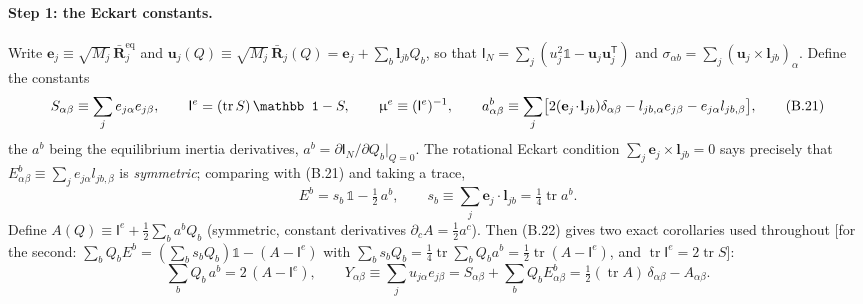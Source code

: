 \paragraph{Step 1: the Eckart constants.}
Write $\mathbf e_j\equiv\sqrt{M_j}\,\bar{\mathbf R}^{\mathrm{eq}}_j$ and $\mathbf u_j(Q)\equiv\sqrt{M_j}\,\bar{\mathbf R}_j(Q)=\mathbf e_j+\sum_b\mathbf l_{jb}Q_b$, so that $\mathsf I_N=\sum_j(u_j^2\mathbb 1-\mathbf u_j\mathbf u_j^{\mathsf T})$ and $\sigma_{\alpha b}=\sum_j(\mathbf u_j\times\mathbf l_{jb})_\alpha$. Define the constants
\begin{equation}
S_{\alpha\beta}\equiv\sum_j e_{j\alpha}e_{j\beta},\qquad
\mathsf I^{e}=(\operatorname{tr}S)\,\mathbb 1-S,\qquad
\Mmu^{e}\equiv(\mathsf I^{e})^{-1},\qquad
a^{b}_{\alpha\beta}\equiv\sum_j\bigl[2(\mathbf e_j\!\cdot\!\mathbf l_{jb})\delta_{\alpha\beta}-l_{jb,\alpha}e_{j\beta}-e_{j\alpha}l_{jb,\beta}\bigr], \tag{B.21}
\end{equation}
the $a^{b}$ being the equilibrium inertia derivatives, $a^b=\partial\mathsf I_N/\partial Q_b|_{Q=0}$. The rotational Eckart condition $\sum_j\mathbf e_j\times\mathbf l_{jb}=0$ says precisely that $E^{b}_{\alpha\beta}\equiv\sum_je_{j\alpha}l_{jb,\beta}$ is \emph{symmetric}; comparing with (B.21) and taking a trace,
\begin{equation}
E^{b}=s_b\,\mathbb 1-\tfrac12\,a^{b},\qquad
s_b\equiv\sum_j\mathbf e_j\!\cdot\!\mathbf l_{jb}=\tfrac14\operatorname{tr}a^{b}. \tag{B.22}
\end{equation}
Define $A(Q)\equiv\mathsf I^{e}+\tfrac12\sum_b a^{b}Q_b$ (symmetric, constant derivatives $\partial_cA=\tfrac12a^c$). Then (B.22) gives two exact corollaries used throughout [for the second: $\sum_bQ_bE^b=(\sum_bs_bQ_b)\mathbb 1-(A-\mathsf I^e)$ with $\sum_bs_bQ_b=\tfrac14\operatorname{tr}\!\sum_bQ_ba^b=\tfrac12\operatorname{tr}(A-\mathsf I^e)$, and $\operatorname{tr}\mathsf I^e=2\operatorname{tr}S$]:
\begin{equation}
\sum_bQ_b\,a^{b}=2\,(A-\mathsf I^{e}),
\qquad
Y_{\alpha\beta}\equiv\sum_ju_{j\alpha}e_{j\beta}=S_{\alpha\beta}+\sum_bQ_bE^b_{\alpha\beta}
=\tfrac12(\operatorname{tr}A)\,\delta_{\alpha\beta}-A_{\alpha\beta}. \tag{B.23}
\end{equation}

